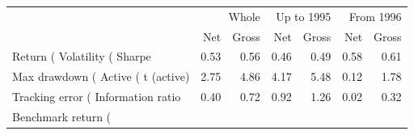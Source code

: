 \begin{tabular}{lrrrrrr}
\toprule
 & \multicolumn{2}{r}{Whole} & \multicolumn{2}{r}{Up to 1995} & \multicolumn{2}{r}{From 1996} \\
 & Net & Gross & Net & Gross & Net & Gross \\
\midrule
Return (%
Volatility (%
Sharpe & 0.53 & 0.56 & 0.46 & 0.49 & 0.58 & 0.61 \\
Max drawdown (%
Active (%
t (active) & 2.75 & 4.86 & 4.17 & 5.48 & 0.12 & 1.78 \\
Tracking error (%
Information ratio & 0.40 & 0.72 & 0.92 & 1.26 & 0.02 & 0.32 \\
Benchmark return (%
\bottomrule
\end{tabular}
